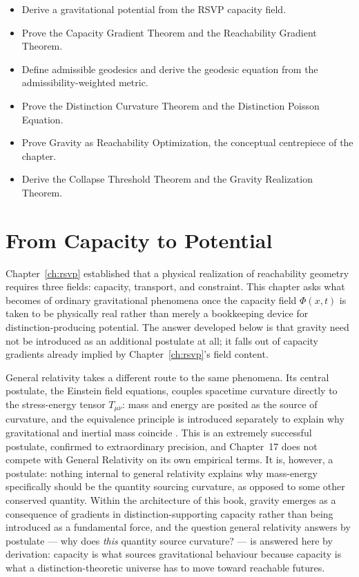 \documentclass[12pt,twoside,openright]{book}
\newenvironment{objectives}{%
  \begin{tcolorbox}[colback=DistBlue!5,colframe=DistBlue,
    title={\faCheckCircle\enspace Learning Objectives},
    fonttitle=\sffamily\bfseries\color{white},
    attach boxed title to top left={yshift=-2mm,xshift=4mm},
    boxed title style={colback=DistBlue},breakable]
  \begin{itemize}[leftmargin=*,nosep]}{%
  \end{itemize}\end{tcolorbox}\vspace{1em}}
\begin{document}
\begin{objectives}
  \item Derive a gravitational potential from the RSVP
        capacity field.
  \item Prove the Capacity Gradient Theorem and the
        Reachability Gradient Theorem.
  \item Define admissible geodesics and derive the geodesic
        equation from the admissibility-weighted metric.
  \item Prove the Distinction Curvature Theorem and the
        Distinction Poisson Equation.
  \item Prove Gravity as Reachability Optimization, the
        conceptual centrepiece of the chapter.
  \item Derive the Collapse Threshold Theorem and the
        Gravity Realization Theorem.
\end{objectives}

\section{From Capacity to Potential}
\label{sec:ch17-potential}

Chapter~\ref{ch:rsvp} established that a physical realization
of reachability geometry requires three fields: capacity,
transport, and constraint. This chapter asks what becomes of
ordinary gravitational phenomena once the capacity field
$\Phi(x,t)$ is taken to be physically real rather than merely
a bookkeeping device for distinction-producing potential. The
answer developed below is that gravity need not be introduced
as an additional postulate at all; it falls out of capacity
gradients already implied by Chapter~\ref{ch:rsvp}'s field
content.

General relativity takes a different route to the same
phenomena. Its central postulate, the Einstein field
equations, couples spacetime curvature directly to the
stress-energy tensor $T_{\mu\nu}$: mass and energy are
posited as the source of curvature, and the equivalence
principle is introduced separately to explain why
gravitational and inertial mass coincide
\parencite{misner1973}. This is an extremely successful
postulate, confirmed to extraordinary precision, and Chapter~17
does not compete with General Relativity on its own
empirical terms. It is, however, a postulate: nothing internal
to general relativity explains why mass-energy specifically
should be the quantity sourcing curvature, as opposed to some
other conserved quantity. Within the architecture of this
book, gravity emerges as a consequence of gradients in
distinction-supporting capacity rather than being introduced
as a fundamental force, and the question general relativity
answers by postulate --- why does \emph{this} quantity source
curvature? --- is answered here by derivation: capacity is
what sources gravitational behaviour because capacity is what
a distinction-theoretic universe has to move toward reachable
futures.
\end{document}
